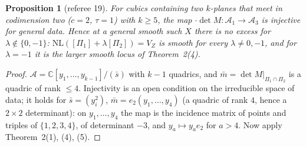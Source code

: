 \documentclass[11pt]{article}
\numberwithin{equation}{section}
\newtheorem{proposition}[theorem]{Proposition}
\theoremstyle{remark}
\newcommand{\CC}{\mathbb{C}}
\newcommand{\NL}{\mathrm{NL}}
\newcommand{\VZ}{V_Z}
\newcommand{\cA}{\mathcal{A}}
\begin{document}
\begin{proposition}[referee 19]\label{prop:k5}
For cubics containing two $k$-planes that meet in codimension two ($c=2$, $\tau=1$) with $k\ge5$, the map
$\cdot\det M\colon\cA_1\to\cA_3$ is injective for general data. Hence at a general smooth such $X$ there is no
excess for $\lambda\notin\{0,-1\}$: $\NL([\Pi_1]+\lambda[\Pi_2])=\VZ$ is smooth for every $\lambda\ne0,-1$, and for
$\lambda=-1$ it is the larger smooth locus of Theorem~2(4).
\end{proposition}
\begin{proof}
$\cA=\CC[y_1,\dots,y_{k-1}]/(\bar s)$ with $k-1$ quadrics, and $\bar m=\det M|_{\Pi_1\cap\Pi_2}$ is a quadric of
rank $\le4$. Injectivity is an open condition on the irreducible space of data; it holds for
$\bar s=(y_i^2)$, $\bar m=e_2(y_1,\dots,y_4)$ (a quadric of rank $4$, hence a $2\times2$ determinant): on
$y_1,\dots,y_4$ the map is the incidence matrix of points and triples of $\{1,2,3,4\}$, of determinant $-3$,
and $y_a\mapsto y_ae_2$ for $a>4$. Now apply Theorem~2(1), (4), (5).
\end{proof}
\end{document}
